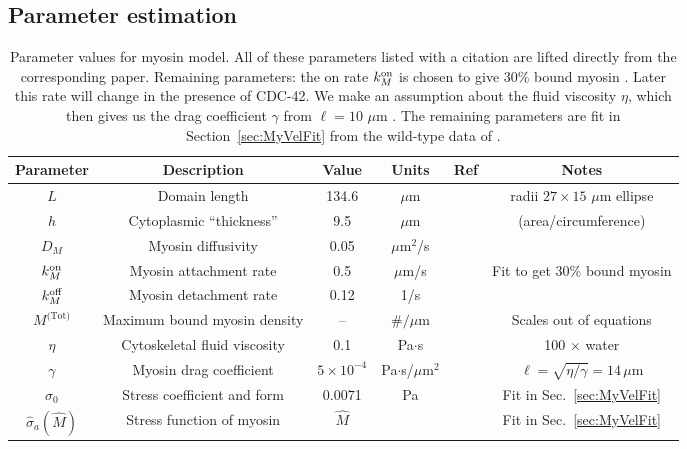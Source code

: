 \documentclass[11pt]{article}
\newcommand{\6}[1]{#1_{\text{6}}}
\newcommand{\3}[1]{#1_{\text{3}}}
\newcommand{\Tot}[1]{#1^\text{(Tot)}}
\newcommand{\My}[1]{#1_M}
\begin{document}
\subsection{Parameter estimation}

\begin{table}
\begin{small}
\centering
\begin{tabular}{|c|c|c|c|c|c|}\hline
Parameter & Description & Value & Units & Ref & Notes \\ \hline
$L$ & Domain length & 134.6 & $\mu$m &  \cite{goehring2011polarization} & radii $27 \times 15$ $\mu$m ellipse\\
$h$ & Cytoplasmic ``thickness'' & 9.5 & $\mu$m &  \cite{goehring2011polarization}  &  (area/circumference)\\ \hline
$\My{D}$ & Myosin diffusivity & 0.05 & $\mu$m$^2$/s &\cite{gross2019guiding} & \\
$\My{\kon}$ & Myosin attachment rate & 0.5 & $\mu$m/s & & Fit to get 30\% bound myosin\\
$\My{\koff} $ & Myosin detachment rate & 0.12 & 1/s & \cite{gross2019guiding}& \\
$\Tot{M}$ & Maximum bound myosin density & -- & $\#/\mu$m & & Scales out of equations \\ \hline
$\eta$ & Cytoskeletal fluid viscosity & 0.1 & Pa$\cdot$s & &100 $\times$ water \\
$\gamma$ & Myosin drag coefficient & $5 \times 10^{-4}$ & Pa$\cdot$s/$\mu$m$^2$ &  & $\ell=\sqrt{\eta/\gamma}=14 \, \mu$m \cite{mayer2010anisotropies}\\ 
$\sigma_0$ & Stress coefficient and form& 0.0071 & Pa & & Fit in Sec.\ \ref{sec:MyVelFit}\\
$\hat \sigma_a(\hat M)$ & Stress function of myosin& $\hat M$ & & & Fit in Sec.\ \ref{sec:MyVelFit}\\ \hline
\end{tabular}
\caption{\label{tab:paramsMy} Parameter values for myosin model. All of these parameters listed with a citation are lifted directly from the corresponding paper. Remaining parameters: the on rate $\My{\kon}$ is chosen to give 30\% bound myosin \cite[Fig.~S3]{gross2019guiding}. Later this rate will change in the presence of CDC-42. We make an assumption about the fluid viscosity $\eta$, which then gives us the drag coefficient $\gamma$ from $\ell=10$ $\mu$m \cite{gross2019guiding}. The remaining parameters are fit in Section\ \ref{sec:MyVelFit} from the wild-type data of \cite{sailer2015dynamic}. }
\end{small}
\end{table}
\end{document}
